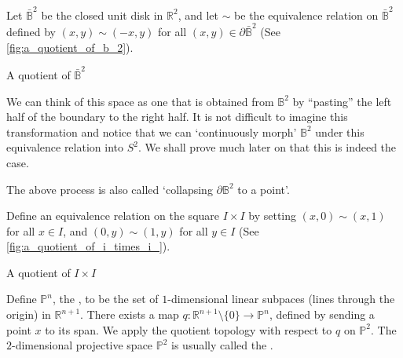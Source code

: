 \documentclass[notoc,notitlepage]{tufte-book}
\begin{document}
\begin{eg}
  Let $\bar{\mathbb{B}}^2$ be the closed unit disk in $\mathbb{R}^2$, and let $\sim$ be the
  equivalence relation on $\bar{\mathbb{B}}^2$ defined by $(x, y) \sim (-x, y)$ for all $(x, y)
  \in \partial \bar{\mathbb{B}}^2$ (See \cref{fig:a_quotient_of_b_2}).
  \begin{marginfigure}
    \centering
    \caption{A quotient of $\bar{\mathbb{B}}^2$}\label{fig:a_quotient_of_b_2}
  \end{marginfigure}
  We can think of this space as one that is obtained from $\mathbb{B}^2$ by ``pasting'' the
  left half of the boundary to the right half. It is not difficult to imagine this transformation
  and notice that we can `continuously morph' $\mathbb{B}^2$ under this equivalence relation into
  $S^2$. We shall prove much later on that this is indeed the case.

  The above process is also called `collapsing $\partial \mathbb{B}^2$ to a point'.
\end{eg}

\begin{eg}
  Define an equivalence relation on the square $I \times I$ by setting $(x, 0) \sim (x, 1)$ for
  all $x \in I$, and $(0, y) \sim (1, y)$ for all $y \in I$ (See
  \cref{fig:a_quotient_of_i_times_i_}).
  \begin{marginfigure}
    \centering
    \caption{A quotient of $I \times I$}\label{fig:a_quotient_of_i_times_i_}
  \end{marginfigure}
\end{eg}

\begin{eg}\label{eg:projective_space}
  Define $\mathbb{P}^n$, the , to be the set of
  $1$-dimensional linear subpaces (lines through the origin) in $\mathbb{R}^{n + 1}$. There
  exists a map $q : \mathbb{R}^{n + 1} \setminus \{ 0 \} \to \mathbb{P}^n$, defined by sending
  a point $x$ to its span. We apply the quotient topology with respect to $q$ on $\mathbb{P}^2$.
  The $2$-dimensional projective space $\mathbb{P}^2$ is usually called the .
\end{eg}
\end{document}
